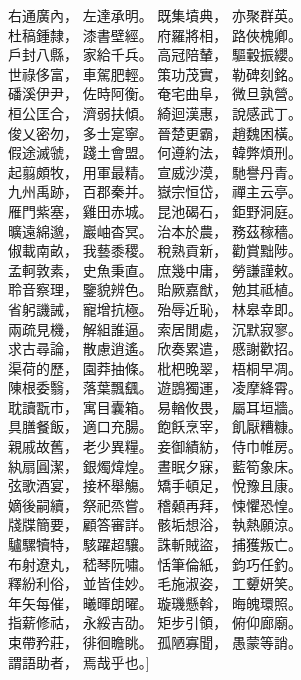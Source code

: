 {     右通廣內， 左達承明。 既集墳典， 亦聚群英。\\
     杜稿鍾隸， 漆書壁經。 府羅將相， 路俠槐卿。\\
     戶封八縣， 家給千兵。 高冠陪輦， 驅轂振纓。\\
     世祿侈富， 車駕肥輕。 策功茂實， 勒碑刻銘。\\
     磻溪伊尹， 佐時阿衡。 奄宅曲阜， 微旦孰營。\\
     桓公匡合， 濟弱扶傾。 綺迴漢惠， 說感武丁。\\
     俊乂密勿， 多士寔寧。 晉楚更霸， 趙魏困橫。\\
     假途滅虢， 踐土會盟。 何遵約法， 韓弊煩刑。\\
     起翦頗牧， 用軍最精。 宣威沙漠， 馳譽丹青。\\
     九州禹跡， 百郡秦并。 嶽宗恒岱， 禪主云亭。\\
     雁門紫塞， 雞田赤城。 昆池碣石， 鉅野洞庭。\\
     曠遠綿邈， 巖岫杳冥。 治本於農， 務茲稼穡。\\
     俶載南畝， 我藝黍稷。 稅熟貢新， 勸賞黜陟。\\
     孟軻敦素， 史魚秉直。 庶幾中庸， 勞謙謹敕。\\
     聆音察理， 鑒貌辨色。 貽厥嘉猷， 勉其祗植。\\
     省躬譏誡， 寵增抗極。 殆辱近恥， 林皋幸即。\\
     兩疏見機， 解組誰逼。 索居閒處， 沉默寂寥。\\
     求古尋論， 散慮逍遙。 欣奏累遣， 慼謝歡招。\\
     渠荷的歷， 園莽抽條。 枇杷晚翠， 梧桐早凋。\\
     陳根委翳， 落葉飄颻。 遊鵾獨運， 凌摩絳霄。\\
     耽讀翫市， 寓目囊箱。 易輶攸畏， 屬耳垣牆。\\
     具膳餐飯， 適口充腸。 飽飫烹宰， 飢厭糟糠。\\
     親戚故舊， 老少異糧。 妾御績紡， 侍巾帷房。\\
     紈扇圓潔， 銀燭煒煌。 晝眠夕寐， 藍筍象床。\\
     弦歌酒宴， 接杯舉觴。 矯手頓足， 悅豫且康。\\
     嫡後嗣續， 祭祀烝嘗。 稽顙再拜， 悚懼恐惶。\\
     牋牒簡要， 顧答審詳。 骸垢想浴， 執熱願涼。\\
     驢騾犢特， 駭躍超驤。 誅斬賊盜， 捕獲叛亡。\\
     布射遼丸， 嵇琴阮嘯。 恬筆倫紙， 鈞巧任釣。\\
     釋紛利俗， 並皆佳妙。 毛施淑姿， 工顰妍笑。\\
     年矢每催， 曦暉朗曜。 璇璣懸斡， 晦魄環照。\\
     指薪修祜， 永綏吉劭。 矩步引領， 俯仰廊廟。\\
     束帶矜莊， 徘徊瞻眺。 孤陋寡聞， 愚蒙等誚。\\
     謂語助者， 焉哉乎也。}]